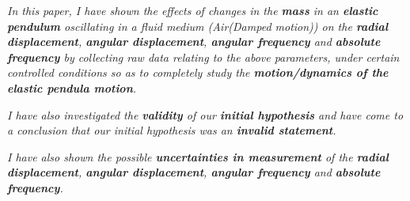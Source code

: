 \textit{In this paper, I have shown the effects of changes in the \textbf{mass} in an \textbf{elastic pendulum} oscillating in a fluid medium (Air(Damped motion)) on the \textbf{radial displacement}, \textbf{angular displacement}, \textbf{angular frequency} and \textbf{absolute frequency} by collecting raw data relating to the above parameters, under certain controlled conditions so as to completely study the \textbf{motion/dynamics of the elastic pendula motion}.}

\textit{I have also investigated the \textbf{validity} of our \textbf{initial hypothesis} and have come to a conclusion that our initial hypothesis was an \textbf{invalid statement}.}

\textit{I have also shown the possible \textbf{uncertainties in measurement} of the \textbf{radial displacement}, \textbf{angular displacement}, \textbf{angular frequency} and \textbf{absolute frequency}.}

